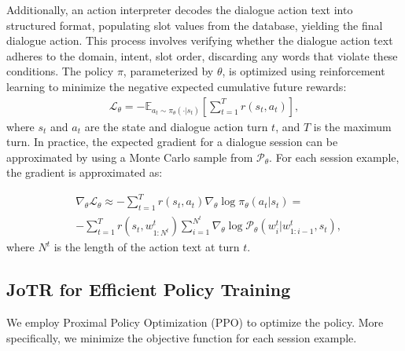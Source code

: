 \documentclass[letterpaper]{article} %
\begin{document}
Additionally, an action interpreter decodes the dialogue action text into structured format, populating slot values from the database, yielding the final dialogue action. 
This process involves verifying whether the dialogue action text adheres to the domain, intent, slot order, discarding any words that violate these conditions.
The policy $\pi$, parameterized by $\theta$, is optimized using reinforcement learning to minimize the negative expected cumulative future rewards: 
\begin{equation}
\begin{aligned}
    \mathcal{L}_{\theta} = -\mathbb{E}_{a_t \sim \pi_{\theta}(\cdot|s_t)}\left[\sum_{t=1}^T r(s_t, a_t)\right],
    \label{e:2}
\end{aligned}
\end{equation}
where $s_t$ and $a_t$ are the state and dialogue action turn $t$, and $T$ is the maximum turn. In practice, the expected gradient for a dialogue session can be approximated by using a Monte Carlo sample from $\mathcal{P}_{\theta}$. For each session example, the gradient is approximated as:

\begin{equation}
\begin{aligned}
    &\nabla_{\theta}\mathcal{L}_{\theta} \approx -\sum_{t=1}^T r(s_t, a_t)\nabla_{\theta}\log \pi_{\theta}(a_t|s_t)
    = \\&-\sum_{t=1}^T r(s_t, w^t_{1:N^t}) \sum_{i=1}^{N^t} \nabla_{\theta} \log \mathcal{P}_{\theta}(w_i^t|w_{1:i-1}^t, s_t), 
    \label{e:3}
\end{aligned}
\end{equation}
where $N^t$ is the length of the action text at turn $t$. 

\subsection{JoTR for Efficient Policy Training}
We employ Proximal Policy Optimization (PPO) \cite{schulman2017proximal} to optimize the policy. More specifically, we minimize the objective function for each session example.
\end{document}
